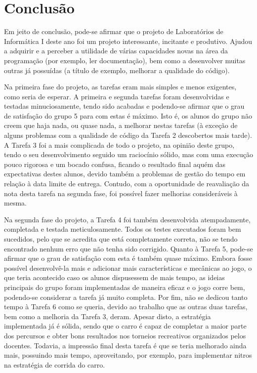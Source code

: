 \documentclass[a4paper]{report}
\begin{document}
\chapter{Conclusão}

Em jeito de conclusão, pode-se afirmar que o projeto de Laboratórios de Informática I deste ano foi um projeto interessante, incitante e produtivo. Ajudou a adquirir e a perceber a utilidade de várias capacidades novas na área da programação (por exemplo, ler documentação), bem como a desenvolver muitas outras já possuídas (a título de exemplo, melhorar a qualidade do código).

Na primeira fase do projeto, as tarefas eram mais simples e menos exigentes, como seria de esperar. A primeira e segunda tarefas foram desenvolvidas e testadas minuciosamente, tendo sido acabadas e podendo-se afirmar que o grau de satisfação do grupo 5 para com estas é máximo. Isto é, os alunos do grupo não creem que haja nada, ou quase nada, a melhorar nestas tarefas (à exceção de alguns problemas com a qualidade de código da Tarefa 2 descobertos mais tarde). A Tarefa 3 foi a mais complicada de todo o projeto, na opinião deste grupo, tendo o seu desenvolvimento seguido um raciocínio sólido, mas com uma execução pouco rigorosa e um bocado confusa, ficando o resultado final aquém das expectativas destes alunos, devido também a problemas de gestão do tempo em relação à data limite de entrega. Contudo, com a oportunidade de reavaliação da nota desta tarefa na segunda fase, foi possível fazer melhorias consideráveis à mesma.

Na segunda fase do projeto, a Tarefa 4 foi também desenvolvida atempadamente, completada e testada meticulosamente. Todos os testes executados foram bem sucedidos, pelo que se acredita que está completamente correta, não se tendo encontrado nenhum erro que não tenha sido corrigido. Quanto à Tarefa 5, pode-se afirmar que o grau de satisfação com esta é também quase máximo. Embora fosse possível desenvolvê-la mais e adicionar mais características e mecânicas ao jogo, o que teria acontecido caso os alunos dispusessem de mais tempo, as ideias principais do grupo foram implementadas de maneira eficaz e o jogo corre bem, podendo-se considerar a tarefa já muito completa. Por fim, não se dedicou tanto tempo à Tarefa 6 como se queria, devido ao trabalho que as outras duas tarefas, bem como a melhoria da Tarefa 3, deram. Apesar disto, a estratégia implementada já é sólida, sendo que o carro é capaz de completar a maior parte dos percursos e obter bons resultados nos torneios recreativos organizados pelos docentes. Todavia, a impressão final desta tarefa é que se teria melhorado ainda mais, possuindo mais tempo, aproveitando, por exemplo, para implementar nitros na estratégia de corrida do carro.
\end{document}
